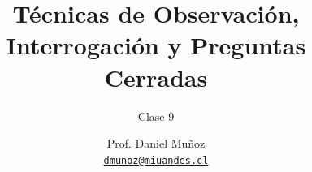 \documentclass[11pt, aspectratio=169, xcolor=table,hyphens]{beamer}
\begin{document}
\author{Prof. Daniel Muñoz \\
	\href{mailto:dmunoz@miuandes.cl}{\texttt{dmunoz@miuandes.cl}}}
\title{Técnicas de Observación, Interrogación y Preguntas Cerradas}
\subtitle{Clase 9}
\date{}
\maketitle

\end{document}
